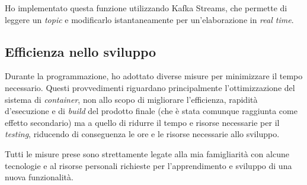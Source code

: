 Ho implementato questa funzione utilizzando Kafka Streams, che permette di leggere un \textit{topic} e modificarlo istantaneamente per un'elaborazione in \textit{real time}.

\subsection{Efficienza nello sviluppo}

Durante la programmazione, ho adottato diverse misure per minimizzare il tempo necessario.
Questi provvedimenti riguardano principalmente l'ottimizzazione del sistema di \textit{container}, non allo scopo di migliorare l'efficienza, rapidità d'esecuzione e di \textit{build} del prodotto finale (che è stata comunque raggiunta come effetto secondario) ma a quello di ridurre il tempo e risorse necessarie per il \textit{testing}, riducendo di conseguenza le ore e le risorse necessarie allo sviluppo.

Tutti le misure prese sono strettamente legate alla mia famigliarità con alcune tecnologie e al risorse personali richieste per l'apprendimento e sviluppo di una nuova funzionalità.

